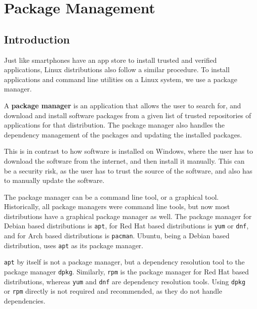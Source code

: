 \chapter{Package Management}

\section{Introduction}

Just like smartphones have an app store to install trusted and verified applications, Linux distributions also follow a similar procedure.
To install applications and command line utilities on a Linux system, we use a package manager.

\begin{definition}
    A \textbf{package manager} is an application that allows the user to search for, 
    and download and install software packages from a given list of trusted repositories of applications for that distribution.
    The package manager also handles the dependency management of the packages and updating the installed packages.
\end{definition}

This is in contrast to how software is installed on Windows, where the user has to download the software from the internet, and then install it manually.
This can be a security risk, as the user has to trust the source of the software, and also has to manually update the software.

The package manager can be a command line tool, or a graphical tool. 
Historically, all package managers were command line tools, but now most distributions have a graphical package manager as well.
The package manager for Debian based distributions is \lstinline{apt}, for Red Hat based distributions is \lstinline{yum} or \lstinline{dnf}, and for Arch based distributions is \lstinline{pacman}.
Ubuntu, being a Debian based distribution, uses \lstinline{apt} as its package manager.

\begin{remark}
  \lstinline|apt| by itself is not a package manager, but a dependency resolution tool to the package manager \lstinline|dpkg|.
  Similarly, \lstinline|rpm| is the package manager for Red Hat based distributions, whereas \lstinline|yum| and \lstinline|dnf| are dependency resolution tools.
  Using \lstinline|dpkg| or \lstinline|rpm| directly is not required and recommended, as they do not handle dependencies.
\end{remark}

